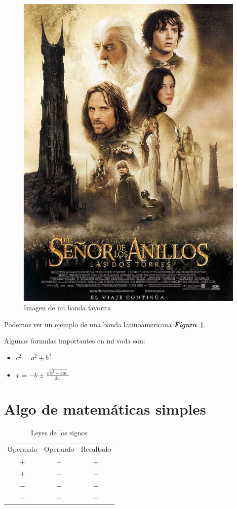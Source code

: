 \begin{figure}[h]
  \centering
  \includegraphics[scale=0.4]{IMG/13.jpg}
  \caption{Imagen de mi banda favorita}
  \label{fig:Soda}
\end{figure}

Podemos ver un ejemplo de una banda latinoamericana \textbf{\textbf{\emph{Figura}}}~\ref{fig:Soda}.

\newpage
Algunas formulas importantes en mi voda son:
\begin{itemize}
\item $c^2 = a^2 + b^2$
\item $x=-b \pm \frac{\sqrt{b^2-4ac}}{2a}$
\end{itemize}  
  
\section{Algo de matemáticas simples}

\begin{table}[h]
  \centering
  \begin{tabular} {| c c c |}
    \hline
    Operando & Operando & Resultado\\
    $+$ & $+$ & $+$\\
    $+$ & $-$ & $-$\\
    $-$ & $-$ & $-$\\
    $-$ & $+$ & $-$\\
    \hline
  \end{tabular}
  \caption{Leyes de los signos}
  \end{table}
